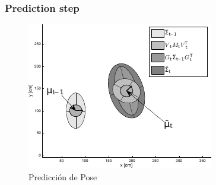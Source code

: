 \begin{frame}
    \frametitle{Prediction step}
    
    \begin{figure}[!h]
        \includegraphics[width=0.5\columnwidth]{./images/ekf_prediction_step.pdf}
        \caption{Predicción de Pose}
    \end{figure}
    
\end{frame}

